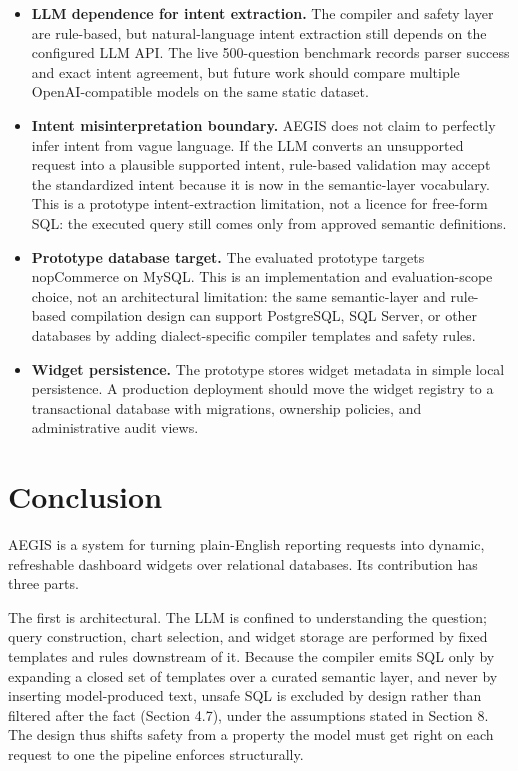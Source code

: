 \documentclass[pdflatex,sn-mathphys-num]{sn-jnl}
\begin{document}
\begin{itemize}
\item \textbf{LLM dependence for intent extraction.} The compiler and safety layer are rule-based, but natural-language intent extraction still depends on the configured LLM API. The live 500-question benchmark records parser success and exact intent agreement, but future work should compare multiple OpenAI-compatible models on the same static dataset.
\item \textbf{Intent misinterpretation boundary.} AEGIS does not claim to perfectly infer intent from vague language. If the LLM converts an unsupported request into a plausible supported intent, rule-based validation may accept the standardized intent because it is now in the semantic-layer vocabulary. This is a prototype intent-extraction limitation, not a licence for free-form SQL: the executed query still comes only from approved semantic definitions.
\item \textbf{Prototype database target.} The evaluated prototype targets nopCommerce on MySQL. This is an implementation and evaluation-scope choice, not an architectural limitation: the same semantic-layer and rule-based compilation design can support PostgreSQL, SQL Server, or other databases by adding dialect-specific compiler templates and safety rules.
\item \textbf{Widget persistence.} The prototype stores widget metadata in simple local persistence. A production deployment should move the widget registry to a transactional database with migrations, ownership policies, and administrative audit views.
\end{itemize}

\section{Conclusion}

AEGIS is a system for turning plain-English reporting requests into dynamic, refreshable dashboard widgets over relational databases. Its contribution has three parts.


The first is architectural. The LLM is confined to understanding the question; query construction, chart selection, and widget storage are performed by fixed templates and rules downstream of it. Because the compiler emits SQL only by expanding a closed set of templates over a curated semantic layer, and never by inserting model-produced text, unsafe SQL is excluded by design rather than filtered after the fact (Section 4.7), under the assumptions stated in Section 8. The design thus shifts safety from a property the model must get right on each request to one the pipeline enforces structurally.
\end{document}
